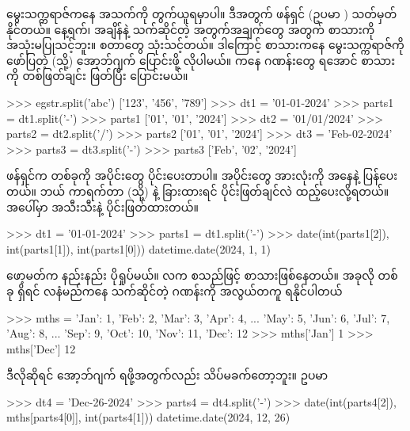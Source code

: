 မွေးသက္ကရာဇ်ကနေ အသက်ကို တွက်ယူရမှာပါ။ ဒီအတွက် ဖန်ရှင် (ဥပမာ ) သတ်မှတ်နိုင်တယ်။ နေ့ရက်၊ အချိန်နဲ့ သက်ဆိုင်တဲ့ အတွက်\allowbreak အချက်တွေ အတွက် စာသားကို အသုံးမပြုသင့်ဘူး။ \fEn{,}  စတာတွေ သုံးသင့်တယ်။ ဒါကြောင့် စာသားကနေ မွေးသက္ကရာဇ်ကို ဖော်ပြတဲ့  (သို့)  အော့ဘ်ဂျက် ပြောင်းဖို့ လိုပါမယ်။  ကနေ \fEn{,} \fEn{,}  ဂဏန်းတွေ ရအောင် စာသားကို တစ်ဖြတ်ချင်း ဖြတ်ပြီး ပြောင်းမယ်။ 

\begin{codetxt}
>>> egstr.split('abc')
['123', '456', '789']
>>> dt1 = '01-01-2024'
>>> parts1 = dt1.split('-')
>>> parts1
['01', '01', '2024']
>>> dt2 = '01/01/2024'
>>> parts2 = dt2.split('/')
>>> parts2
['01', '01', '2024']
>>> dt3 = 'Feb-02-2024'
>>> parts3 = dt3.split('-')
>>> parts3
['Feb', '02', '2024']
\end{codetxt}
 ဖန်ရှင်က  တစ်ခုကို အပိုင်းတွေ ပိုင်းပေးတာပါ။ အပိုင်းတွေ အားလုံးကို  အနေနဲ့ ပြန်ပေးတယ်။ ဘယ် ကာရက်တာ (သို့)  နဲ့ ခြားထားရင် ပိုင်းဖြတ်ချင်လဲ ထည့်ပေးလို့ရတယ်။ အပေါ်မှာ \fEn{,} \fEn{,}  အသီးသီးနဲ့ ပိုင်းဖြတ်ထားတယ်။

\begin{codetxt}
>>> dt1 = '01-01-2024'
>>> parts1 = dt1.split('-')
>>> date(int(parts1[2]), int(parts1[1]), int(parts1[0]))
datetime.date(2024, 1, 1)
\end{codetxt}

 ဖော့မတ်က နည်းနည်း ပိုရှုပ်မယ်။ လက \fEn{,}  စသည်ဖြင့်  စာသားဖြစ်နေတယ်။ အခုလို  တစ်ခု ရှိရင် လနံမည်ကနေ သက်ဆိုင်တဲ့ ဂဏန်းကို အလွယ်တကူ ရနိုင်ပါတယ်

\begin{codetxt}
>>> mths = {'Jan': 1, 'Feb': 2, 'Mar': 3, 'Apr': 4, 
...         'May': 5, 'Jun': 6, 'Jul': 7, 'Aug': 8, 
...         'Sep': 9, 'Oct': 10, 'Nov': 11, 'Dec': 12}
>>> mths['Jan']
1
>>> mths['Dec']
12
\end{codetxt}
ဒီလိုဆိုရင်  အော့ဘ်ဂျက် ရဖို့အတွက်လည်း သိပ်မခက်တော့ဘူး။ ဥပမာ
\begin{codetxt}
>>> dt4 = 'Dec-26-2024'
>>> parts4 = dt4.split('-')
>>> date(int(parts4[2]), mths[parts4[0]], int(parts4[1]))
datetime.date(2024, 12, 26)
\end{codetxt}

